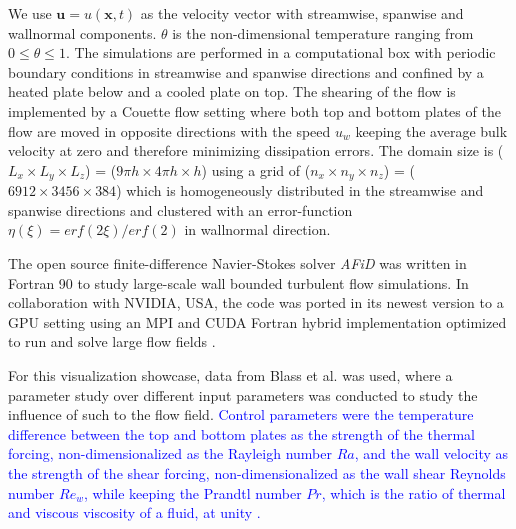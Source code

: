 \documentclass[5p,times]{elsarticle}
\begin{document}
We use $ \boldsymbol{u}=u(\boldsymbol{x},t) $ as the velocity vector with streamwise, spanwise and wallnormal components. $ \theta $ is the non-dimensional temperature ranging from $ 0 \leq \theta \leq 1 $. The simulations are performed in a computational box with periodic boundary conditions in streamwise and spanwise directions and confined by a heated plate below and a cooled plate on top. The shearing of the flow is implemented by a Couette flow setting where both top and bottom plates of the flow are moved in opposite directions with the speed $ u_w $ keeping the average bulk velocity at zero and therefore minimizing dissipation errors. The domain size is ($ L_x \times L_y \times L_z $) = ($ 9\pi h \times 4\pi h \times h $) using a grid of ($ n_x \times n_y \times n_z $) = ($ 6912 \times 3456 \times 384 $) which is homogeneously distributed in the streamwise and spanwise directions and clustered with an error-function $ \eta(\xi)=erf(2\xi)/erf(2) $ in wallnormal direction.

The open source finite-difference Navier-Stokes solver \textit{AFiD} \cite{poe15c} was written in Fortran 90 to study large-scale wall bounded turbulent flow simulations. In collaboration with NVIDIA, USA, the code was ported in its newest version to a GPU setting using an MPI and CUDA Fortran hybrid implementation optimized to run and solve large flow fields \cite{zhu18b}.

For this visualization showcase, data from Blass et al. \cite{bla18} was used, where a parameter study over different input parameters was conducted to study the influence of such to the flow field. \textcolor{blue}{Control parameters were the temperature difference between the top and bottom plates as the strength of the thermal forcing, non-dimensionalized as the Rayleigh number $Ra$, and the wall velocity as the strength of the shear forcing, non-dimensionalized as the wall shear Reynolds number $Re_w$, while keeping the Prandtl number $Pr$, which is the ratio of thermal and viscous viscosity of a fluid, at unity \cite{bla18}.} 


%
%
\end{document}
